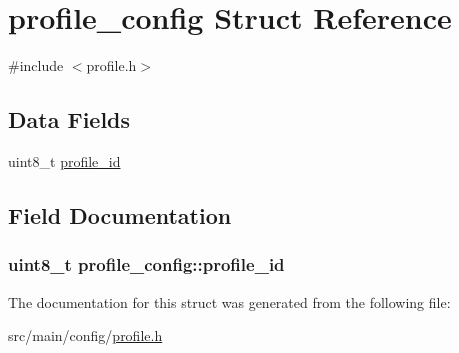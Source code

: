 \hypertarget{structprofile__config}{\section{profile\+\_\+config Struct Reference}
\label{structprofile__config}
}


{\ttfamily \#include $<$profile.\+h$>$}

\subsection*{Data Fields}
\begin{DoxyCompactItemize}
\item 
uint8\+\_\+t \hyperlink{structprofile__config_ab2c81e340688f07738f41b233d591cc1}{profile\+\_\+id}
\end{DoxyCompactItemize}


\subsection{Field Documentation}
\hypertarget{structprofile__config_ab2c81e340688f07738f41b233d591cc1}{
\subsubsection[{profile\+\_\+id}]{\setlength{\rightskip}{0pt plus 5cm}uint8\+\_\+t profile\+\_\+config\+::profile\+\_\+id}}\label{structprofile__config_ab2c81e340688f07738f41b233d591cc1}


The documentation for this struct was generated from the following file\+:\begin{DoxyCompactItemize}
\item 
src/main/config/\hyperlink{profile_8h}{profile.\+h}\end{DoxyCompactItemize}
